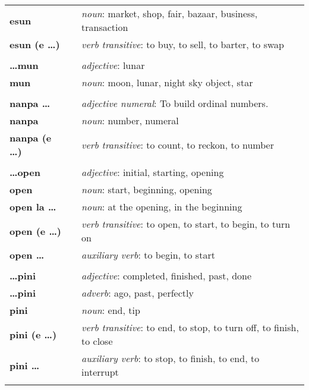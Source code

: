 \begin{supertabular}{p{2,5cm}|ll}
\textbf{esun} && \textit{noun}: market, shop, fair, bazaar, business, transaction \\ %
\textbf{esun (e \dots)} && \textit{verb transitive}: to buy, to sell, to barter, to swap \\ %
 && \\ %
%
\textbf{\dots mun} && \textit{adjective}: lunar \\ %
\textbf{mun} && \textit{noun}: moon, lunar, night sky object, star \\ %
 && \\ %
%
\textbf{nanpa \dots} && \textit{adjective numeral}: To build ordinal numbers. \\ %
\textbf{nanpa} && \textit{noun}: number, numeral \\ %
\textbf{nanpa (e \dots)} && \textit{verb transitive}: to count, to reckon,  to number \\ %
 && \\ %
%
\textbf{\dots open} && \textit{adjective}: initial, starting, opening \\ %
\textbf{open} && \textit{noun}: start, beginning, opening \\ %
\textbf{open la \dots} && \textit{noun}: at the opening, in the beginning  \\ %
\textbf{open (e \dots)} && \textit{verb transitive}: to open, to start, to begin, to turn on \\ %
\textbf{open \dots } && \textit{auxiliary verb}: to begin, to start \\ %
 && \\ %
%
\textbf{\dots pini} && \textit{adjective}: completed, finished, past, done \\ %
\textbf{\dots pini} && \textit{adverb}: ago, past, perfectly \\ %
\textbf{pini} && \textit{noun}: end, tip \\ %
\textbf{pini (e \dots)} && \textit{verb transitive}: to end, to stop, to turn off, to finish, to close \\ %
\textbf{pini \dots } && \textit{auxiliary verb}: to stop, to finish, to end, to interrupt \\ %
 && \\ %

\end{supertabular}
